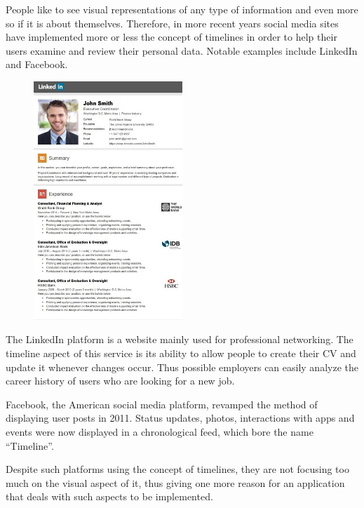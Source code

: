 \documentclass{report}
\begin{document}
People like to see visual representations of any type of information and even more so if it is about themselves. Therefore, in more recent years social media sites have implemented more or less the concept of timelines in order to help their users examine and review their personal data. Notable examples include LinkedIn and Facebook. \par

\begin{figure}
	\vspace*{-1.2cm}
    \centering
    \includegraphics[width=0.5\textwidth]{linkedin}
	\vspace{-80pt} 
\end{figure}
The LinkedIn platform is a website mainly used for professional networking. The timeline aspect of this service is its ability to allow people to create their CV and update it whenever changes occur. Thus possible employers can easily analyze the career history of users who are looking for a new job.\par

Facebook, the American social media platform, revamped the method of displaying user posts in 2011. Status updates, photos, interactions with apps and events were now displayed in a chronological feed, which bore the name “Timeline”.\par

Despite such platforms using the concept of timelines, they are not focusing too much on the visual aspect of it, thus giving one more reason for an application that deals with such aspects to be implemented.\par
\end{document}
